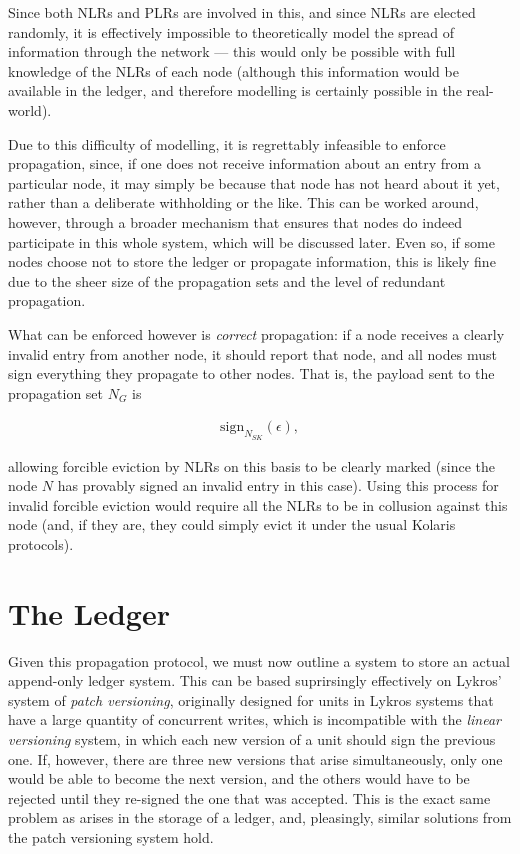 \documentclass{extreport}
\begin{document}
Since both NLRs and PLRs are involved in this, and since NLRs are elected randomly, it is effectively impossible to theoretically model the spread of information through the network --- this would only be possible with full knowledge of the NLRs of each node (although this information would be available in the ledger, and therefore modelling is certainly possible in the real-world).

Due to this difficulty of modelling, it is regrettably infeasible to enforce propagation, since, if one does not receive information about an entry from a particular node, it may simply be because that node has not heard about it yet, rather than a deliberate withholding or the like. This can be worked around, however, through a broader mechanism that ensures that nodes do indeed participate in this whole system, which will be discussed later. Even so, if some nodes choose not to store the ledger or propagate information, this is likely fine due to the sheer size of the propagation sets and the level of redundant propagation.

What can be enforced however is \emph{correct} propagation: if a node receives a clearly invalid entry from another node, it should report that node, and all nodes must sign everything they propagate to other nodes. That is, the payload sent to the propagation set \(N_G\) is

\begin{align*}
\mathrm{sign}_{N_{SK}}(\epsilon), \tag{2.3}
\end{align*}

allowing forcible eviction by NLRs on this basis to be clearly marked (since the node \(N\) has provably signed an invalid entry in this case). Using this process for invalid forcible eviction would require all the NLRs to be in collusion against this node (and, if they are, they could simply evict it under the usual Kolaris protocols).

\chapter{The Ledger}
\label{sec:orge05d024}

Given this propagation protocol, we must now outline a system to store an actual append-only ledger system. This can be based suprirsingly effectively on Lykros' system of \emph{patch versioning}, originally designed for units in Lykros systems that have a large quantity of concurrent writes, which is incompatible with the \emph{linear versioning} system, in which each new version of a unit should sign the previous one. If, however, there are three new versions that arise simultaneously, only one would be able to become the next version, and the others would have to be rejected until they re-signed the one that was accepted. This is the exact same problem as arises in the storage of a ledger, and, pleasingly, similar solutions from the patch versioning system hold.
\end{document}

